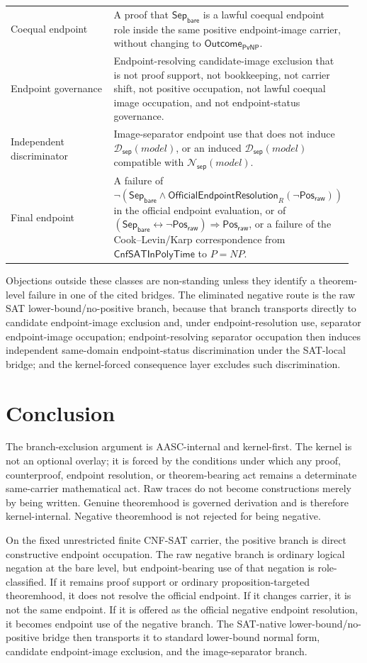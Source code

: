 \documentclass[11pt]{article}
\theoremstyle{definition}
\theoremstyle{remark}
\newcommand{\PosRaw}{\mathsf{Pos}_{\mathsf{raw}}}
\newcommand{\SepBare}{\mathsf{Sep}_{\mathsf{bare}}}
\newcommand{\CnfSATP}{\mathsf{CnfSATInPolyTime}}
\newcommand{\OfficialEndpointResolution}{\mathsf{OfficialEndpointResolution}}
\newcommand{\SepDisc}{\mathcal{D}_{\mathsf{sep}}}
\newcommand{\NoSepDisc}{\mathcal{N}_{\mathsf{sep}}}
\newcommand{\OutcomePvNP}{\mathsf{Outcome}_{\mathsf{PvNP}}}
\begin{document}
{\begin{longtable}{@{}>{\raggedright\arraybackslash}p{0.30\linewidth}>{\raggedright\arraybackslash}p{0.66\linewidth}@{}}
Coequal endpoint & A proof that \(\SepBare\) is a lawful coequal endpoint role inside the same positive endpoint-image carrier, without changing to \(\OutcomePvNP\). \\
Endpoint governance & Endpoint-resolving candidate-image exclusion that is not proof support, not bookkeeping, not carrier shift, not positive occupation, not lawful coequal image occupation, and not endpoint-status governance. \\
Independent discriminator & Image-separator endpoint use that does not induce \(\SepDisc(model)\), or an induced \(\SepDisc(model)\) compatible with \(\NoSepDisc(model)\). \\
Final endpoint & A failure of \(\neg(\SepBare\wedge\OfficialEndpointResolution_R(\neg\PosRaw))\) in the official endpoint evaluation, or of \((\SepBare\leftrightarrow\neg\PosRaw)\Rightarrow\PosRaw\), or a failure of the Cook--Levin/Karp correspondence from \(\CnfSATP\) to \(P=NP\). \\
\bottomrule
\end{longtable}
}

Objections outside these classes are non-standing unless they identify a theorem-level failure in one of the cited bridges. The eliminated negative route is the raw SAT lower-bound/no-positive branch, because that branch transports directly to candidate endpoint-image exclusion and, under endpoint-resolution use, separator endpoint-image occupation; endpoint-resolving separator occupation then induces independent same-domain endpoint-status discrimination under the SAT-local bridge; and the kernel-forced consequence layer excludes such discrimination.


\section{Conclusion}
The branch-exclusion argument is AASC-internal and kernel-first. The kernel is not an optional overlay; it is forced by the conditions under which any proof, counterproof, endpoint resolution, or theorem-bearing act remains a determinate same-carrier mathematical act. Raw traces do not become constructions merely by being written. Genuine theoremhood is governed derivation and is therefore kernel-internal. Negative theoremhood is not rejected for being negative.

On the fixed unrestricted finite CNF-SAT carrier, the positive branch is direct constructive endpoint occupation. The raw negative branch is ordinary logical negation at the bare level, but endpoint-bearing use of that negation is role-classified. If it remains proof support or ordinary proposition-targeted theoremhood, it does not resolve the official endpoint. If it changes carrier, it is not the same endpoint. If it is offered as the official negative endpoint resolution, it becomes endpoint use of the negative branch. The SAT-native lower-bound/no-positive bridge then transports it to standard lower-bound normal form, candidate endpoint-image exclusion, and the image-separator branch.
\end{document}
